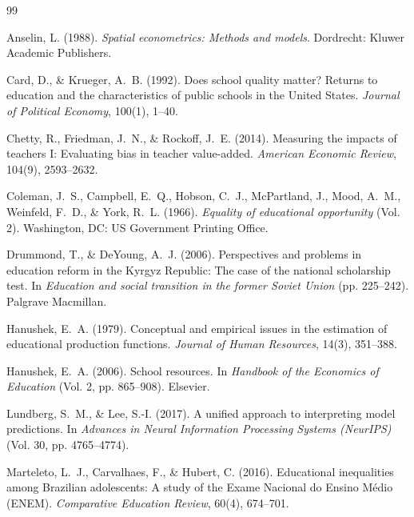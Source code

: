 \documentclass[12pt,letterpaper]{report}
\begin{document}
\begin{singlespace}
\begin{thebibliography}{99}

Anselin, L. (1988). \textit{Spatial econometrics: Methods and models}. Dordrecht: Kluwer Academic Publishers.

Card, D., \& Krueger, A.~B. (1992). Does school quality matter? Returns to education and the characteristics of public schools in the United States. \textit{Journal of Political Economy}, 100(1), 1--40.

Chetty, R., Friedman, J.~N., \& Rockoff, J.~E. (2014). Measuring the impacts of teachers I: Evaluating bias in teacher value-added. \textit{American Economic Review}, 104(9), 2593--2632.

Coleman, J.~S., Campbell, E.~Q., Hobson, C.~J., McPartland, J., Mood, A.~M., Weinfeld, F.~D., \& York, R.~L. (1966). \textit{Equality of educational opportunity} (Vol. 2). Washington, DC: US Government Printing Office.

Drummond, T., \& DeYoung, A.~J. (2006). Perspectives and problems in education reform in the Kyrgyz Republic: The case of the national scholarship test. In \textit{Education and social transition in the former Soviet Union} (pp. 225--242). Palgrave Macmillan.

Hanushek, E.~A. (1979). Conceptual and empirical issues in the estimation of educational production functions. \textit{Journal of Human Resources}, 14(3), 351--388.

Hanushek, E.~A. (2006). School resources. In \textit{Handbook of the Economics of Education} (Vol. 2, pp. 865--908). Elsevier.

Lundberg, S.~M., \& Lee, S.-I. (2017). A unified approach to interpreting model predictions. In \textit{Advances in Neural Information Processing Systems (NeurIPS)} (Vol. 30, pp. 4765--4774).

Marteleto, L.~J., Carvalhaes, F., \& Hubert, C. (2016). Educational inequalities among Brazilian adolescents: A study of the Exame Nacional do Ensino Médio (ENEM). \textit{Comparative Education Review}, 60(4), 674--701.


\end{thebibliography}
\end{singlespace}
\end{document}
